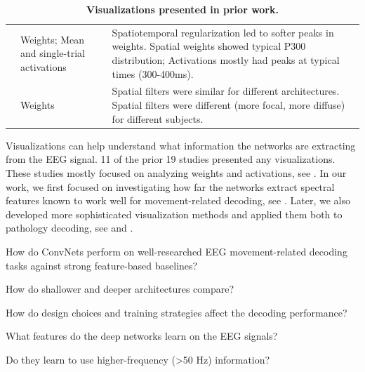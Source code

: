 \begin{table}[h!tb]
\begin{tabularx}{\textwidth}{p{}p{}p{}}
\cite{manor_convolutional_2015} & Weights; Mean and single-trial activations & Spatiotemporal regularization led to softer peaks in weights. Spatial weights showed typical P300 distribution; Activations mostly had peaks at typical times (300-400ms). \\
\cite{cecotti_convolutional_2011} & Weights & Spatial filters were similar for different architectures. Spatial filters were different (more focal, more diffuse) for different subjects. \\
        \bottomrule
    \end{tabularx}
    \caption[Visualizations presented in prior work.]{\textbf{Visualizations presented in prior work.}}  \label{prior-work-visualizations-table}
\end{table}


    Visualizations can help understand what information the networks are
extracting from the EEG signal. 11 of the prior 19 studies presented any
visualizations. These studies mostly focused on analyzing weights and
activations, see . In
our work, we first focused on investigating how far the networks extract
spectral features known to work well for movement-related decoding, see
. Later, we also developed
more sophisticated visualization methods and applied them both to
pathology decoding, see  and
.

\begin{openbox}
\item How do ConvNets perform on well-researched EEG movement-related decoding tasks against strong feature-based baselines?
\item How do shallower and deeper architectures compare?
\item How do design choices and training strategies affect the decoding performance?
\item What features do the deep networks learn on the EEG signals?
\item Do they learn to use higher-frequency (>50 Hz) information?
\end{openbox}
